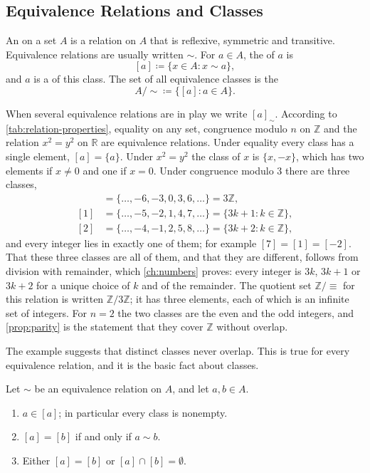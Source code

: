 \subsection{Equivalence Relations and Classes}

\begin{definition}
\label{def:equivalence-relation}
An  on a set $A$ is a relation on $A$ that is reflexive, symmetric and transitive. Equivalence relations are usually written $\sim$. For $a\in A$, the  of $a$ is
\[
[a]\coloneqq\{x\in A: x\sim a\},
\]
and $a$ is a  of this class. The set of all equivalence classes is the 
\[
A/{\sim}\coloneqq\{[a]: a\in A\}.
\]
\end{definition}

When several equivalence relations are in play we write $[a]_\sim$. According to \cref{tab:relation-properties}, equality on any set, congruence modulo $n$ on $\mathbb Z$ and the relation $x^2=y^2$ on $\mathbb R$ are equivalence relations. Under equality every class has a single element, $[a]=\{a\}$. Under $x^2=y^2$ the class of $x$ is $\{x,-x\}$, which has two elements if $x\ne0$ and one if $x=0$. Under congruence modulo $3$ there are three classes,
\begin{align*}
[0]&=\{\ldots,-6,-3,0,3,6,\ldots\}=3\mathbb Z,\\
[1]&=\{\ldots,-5,-2,1,4,7,\ldots\}=\{3k+1: k\in\mathbb Z\},\\
[2]&=\{\ldots,-4,-1,2,5,8,\ldots\}=\{3k+2: k\in\mathbb Z\},
\end{align*}
and every integer lies in exactly one of them; for example $[7]=[1]=[-2]$. That these three classes are all of them, and that they are different, follows from division with remainder, which \cref{ch:numbers} proves: every integer is $3k$, $3k+1$ or $3k+2$ for a unique choice of $k$ and of the remainder. The quotient set $\mathbb Z/{\equiv}$ for this relation is written $\mathbb Z/3\mathbb Z$; it has three elements, each of which is an infinite set of integers. For $n=2$ the two classes are the even and the odd integers, and \cref{prop:parity} is the statement that they cover $\mathbb Z$ without overlap.

The example suggests that distinct classes never overlap. This is true for every equivalence relation, and it is the basic fact about classes.

\begin{lemma}
\label{lem:classes}
Let $\sim$ be an equivalence relation on $A$, and let $a,b\in A$.
\begin{enumerate}
\item $a\in[a]$; in particular every class is nonempty.
\item $[a]=[b]$ if and only if $a\sim b$.
\item Either $[a]=[b]$ or $[a]\cap[b]=\emptyset$.
\end{enumerate}
\end{lemma}

